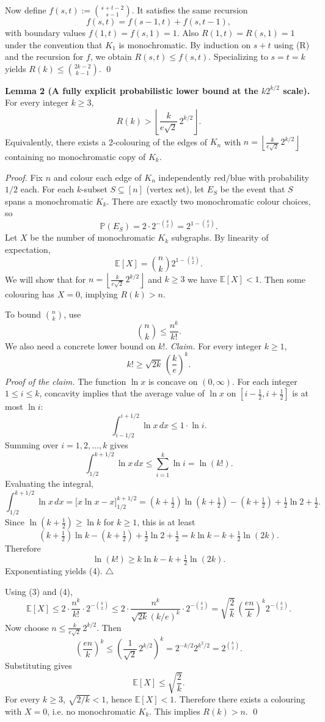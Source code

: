 Now define $f(s,t):=\binom{s+t-2}{s-1}$.
It satisfies the same recursion
\[
 f(s,t)=f(s-1,t)+f(s,t-1),
\]
with boundary values $f(1,t)=f(s,1)=1$.
Also $R(1,t)=R(s,1)=1$ under the convention that $K_1$ is monochromatic.
By induction on $s+t$ using (R) and the recursion for $f$, we obtain $R(s,t)\le f(s,t)$.
Specializing to $s=t=k$ yields $R(k)\le \binom{2k-2}{k-1}$.
\qed

\medskip
\textbf{Lemma 2 (A fully explicit probabilistic lower bound at the $k2^{k/2}$ scale).}
For every integer $k\ge 3$,
\[
R(k) > \left\lfloor \frac{k}{e\sqrt{2}}\,2^{k/2}\right\rfloor.
\]
Equivalently, there exists a 2-colouring of the edges of $K_n$ with
$n=\left\lfloor \frac{k}{e\sqrt{2}}\,2^{k/2}\right\rfloor$
containing no monochromatic copy of $K_k$.

\emph{Proof.}
Fix $n$ and colour each edge of $K_n$ independently red/blue with probability $1/2$ each.
For each $k$-subset $S\subseteq [n]$ (vertex set), let $E_S$ be the event that $S$ spans a monochromatic $K_k$.
There are exactly two monochromatic colour choices, so
\[
\mathbb{P}(E_S)=2\cdot 2^{-\binom{k}{2}} = 2^{1-\binom{k}{2}}.
\]
Let $X$ be the number of monochromatic $K_k$ subgraphs. By linearity of expectation,
\[
\mathbb{E}[X]=\binom{n}{k} 2^{1-\binom{k}{2}}.
\]
We will show that for $n=\left\lfloor \frac{k}{e\sqrt{2}}\,2^{k/2}\right\rfloor$ and $k\ge 3$ we have $\mathbb{E}[X]<1$.
Then some colouring has $X=0$, implying $R(k)>n$.

To bound $\binom{n}{k}$, use
\[
\binom{n}{k} \le \frac{n^k}{k!}. \tag{3}
\]
We also need a concrete lower bound on $k!$.
\emph{Claim.} For every integer $k\ge 1$,
\[
 k! \ge \sqrt{2k}\,\left(\frac{k}{e}\right)^k. \tag{4}
\]
\emph{Proof of the claim.}
The function $\ln x$ is concave on $(0,\infty)$.
For each integer $1\le i\le k$, concavity implies that the average value of $\ln x$ on $[i-\tfrac12,i+\tfrac12]$ is at most $\ln i$:
\[
\int_{i-1/2}^{i+1/2} \ln x\,dx \le 1\cdot \ln i.
\]
Summing over $i=1,2,\dots,k$ gives
\[
\int_{1/2}^{k+1/2} \ln x\,dx \le \sum_{i=1}^k \ln i = \ln(k!).
\]
Evaluating the integral,
\[
\int_{1/2}^{k+1/2} \ln x\,dx = \bigl[x\ln x - x\bigr]_{1/2}^{k+1/2}
= (k+\tfrac12)\ln(k+\tfrac12) - (k+\tfrac12) + \tfrac12\ln 2 + \tfrac12.
\]
Since $\ln(k+\tfrac12)\ge \ln k$ for $k\ge 1$, this is at least
\[
(k+\tfrac12)\ln k - (k+\tfrac12) + \tfrac12\ln 2 + \tfrac12
= k\ln k - k + \tfrac12\ln(2k).
\]
Therefore
\[
\ln(k!) \ge k\ln k - k + \tfrac12\ln(2k).
\]
Exponentiating yields (4).
\hfill $\triangle$

Using (3) and (4),
\[
\mathbb{E}[X]\le 2\cdot \frac{n^k}{k!}\cdot 2^{-\binom{k}{2}}
\le 2\cdot \frac{n^k}{\sqrt{2k}(k/e)^k}\cdot 2^{-\binom{k}{2}}
= \sqrt{\frac{2}{k}}\,\left(\frac{en}{k}\right)^k 2^{-\binom{k}{2}}.
\]
Now choose $n\le \frac{k}{e\sqrt{2}}\,2^{k/2}$.
Then
\[
\left(\frac{en}{k}\right)^k \le \left(\frac{1}{\sqrt{2}}\,2^{k/2}\right)^k = 2^{-k/2} 2^{k^2/2} = 2^{\binom{k}{2}}.
\]
Substituting gives
\[
\mathbb{E}[X] \le \sqrt{\frac{2}{k}}.
\]
For every $k\ge 3$, $\sqrt{2/k}<1$, hence $\mathbb{E}[X]<1$.
Therefore there exists a colouring with $X=0$, i.e. no monochromatic $K_k$.
This implies $R(k)>n$.
\qed

